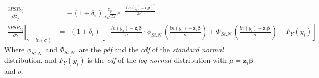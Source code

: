 \documentclass[]{article}
\begin{document}
  $$
  \begin{aligned}
    \frac{\partial PSR_{Y_i}}{\partial \beta_j} & =  -(1+\delta_i) \frac{z_{ji} }{\sigma\sqrt{2\pi} }    e^{ - \frac{\left( ln(y_i) -\pmb{z}_i\pmb{\beta} \right)^2}{2\sigma^2} }\\
    \left.\frac{\partial PSR_{Y_i}}{\partial \gamma}\right|_{\gamma = ln(\sigma)} &=~~(1+\delta_i)\left[    -\frac{ln(y_i) - \pmb{z}_i\pmb{\beta}}{\sigma}\cdot\phi_{St.N.}\left(  \frac{ln(y_i) - \pmb{z}_i\pmb{\beta}}{\sigma}  \right)   +  \Phi_{St.N.}\left(  \frac{ln(y_i) - \pmb{z}_i\pmb{\beta}}{\sigma}  \right) - F_Y(y_i)    \right]
  \end{aligned}
  $$
Where $\phi_{St.N.}$ and $\Phi_{St.N.}$ are the \emph{pdf} and the \emph{cdf} of the \emph{standard normal} distribution, and $F_Y(y_i)$ is the \emph{cdf} of the \emph{log-normal} distribution with $\mu = \pmb{z}_i\pmb{\beta}$ and $\sigma$.
\end{document}
